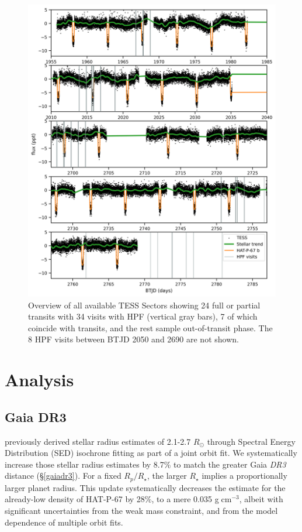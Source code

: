 \documentclass[twocolumn]{aastex631}
\begin{document}
\begin{figure}
    \centering
    \includegraphics[width=0.7\linewidth]{figures/TESS_HAT-P-67b_overview.png}
    \caption{Overview of all available TESS Sectors showing 24 full or partial transits with 34 visits with HPF (vertical gray bars), 7 of which coincide with transits, and the rest sample out-of-transit phase.  The 8 HPF visits between BTJD 2050 and 2690 are not shown.}
    \label{fig:TESSoverview}
\end{figure}


\section{Analysis}

\subsection{Gaia DR3}
\citet{2017AJ....153..211Z} previously derived stellar radius estimates of 2.1-2.7 $R_\odot$ through Spectral Energy Distribution (SED) isochrone fitting as part of a joint orbit fit.  We systematically increase those stellar radius estimates by 8.7\% to match the greater Gaia \emph{DR3} distance (\S \ref{gaiadr3}).  For a fixed $R_p/R_\star$, the larger $R_\star$ implies a proportionally larger planet radius. This update systematically decreases the estimate for the already-low density of HAT-P-67 by 28\%, to a mere 0.035 g$\;$cm$^{-3}$, albeit with significant uncertainties from the weak mass constraint, and from the model dependence of multiple orbit fits.
\end{document}
